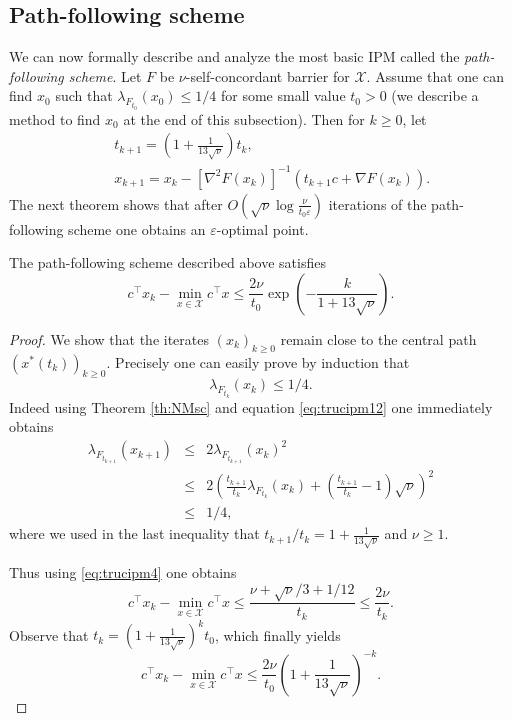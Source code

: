 \documentclass[openany]{now}
\newcommand{\cX}{\mathcal{X}}
\renewcommand{\epsilon}{\varepsilon}
\begin{document}
\subsection{Path-following scheme}
We can now formally describe and analyze the most basic IPM called the {\em path-following scheme}. Let $F$ be $\nu$-self-concordant barrier for $\cX$. Assume that one can find $x_0$ such that $\lambda_{F_{t_0}}(x_0) \leq 1/4$ for some small value $t_0 >0$ (we describe a method to find $x_0$ at the end of this subsection).
Then for $k \geq 0$, let
\begin{eqnarray*}
& & t_{k+1} = \left(1 + \frac1{13\sqrt{\nu}}\right) t_k ,\\
& & x_{k+1} = x_k - [\nabla^2 F(x_k)]^{-1} (t_{k+1} c + \nabla F(x_k) ) .
\end{eqnarray*}
The next theorem shows that after $O\left( \sqrt{\nu} \log \frac{\nu}{t_0 \epsilon} \right)$ iterations of the path-following scheme one obtains an $\epsilon$-optimal point.
\begin{theorem}
The path-following scheme described above satisfies
$$c^{\top} x_k - \min_{x \in \mathcal{X}} c^{\top} x \leq \frac{2 \nu}{t_0} \exp\left( - \frac{k}{1+13\sqrt{\nu}} \right) .$$
\end{theorem}
\begin{proof}
We show that the iterates $(x_k)_{k \geq 0}$ remain close to the central path $(x^*(t_k))_{k \geq 0}$. Precisely one can easily prove by induction that 
$$\lambda_{F_{t_k}}(x_k) \leq 1/4 .$$
Indeed using Theorem \ref{th:NMsc} and equation \eqref{eq:trucipm12} one immediately obtains
\begin{eqnarray*}
\lambda_{F_{t_{k+1}}}(x_{k+1}) & \leq & 2 \lambda_{F_{t_{k+1}}}(x_k)^2 \\
& \leq & 2 \left(\frac{t_{k+1}}{t_k} \lambda_{F_{t_k}}(x_k) + \left(\frac{t_{k+1}}{t_k} - 1\right) \sqrt{\nu}\right)^2  \\
& \leq & 1/4 ,
\end{eqnarray*}
where we used in the last inequality that $t_{k+1} / t_k = 1 + \frac1{13\sqrt{\nu}}$ and $\nu \geq 1$.

Thus using \eqref{eq:trucipm4} one obtains
$$c^{\top} x_k - \min_{x \in \mathcal{X}} c^{\top} x \leq \frac{\nu + \sqrt{\nu} / 3 + 1/12}{t_k} \leq \frac{2 \nu}{t_k} .$$
Observe that $t_{k} = \left(1 + \frac1{13\sqrt{\nu}}\right)^{k} t_0$, which finally yields
$$c^{\top} x_k - \min_{x \in \mathcal{X}} c^{\top} x \leq \frac{2 \nu}{t_0} \left(1 + \frac1{13\sqrt{\nu}}\right)^{- k}.$$
\end{proof}
\end{document}
